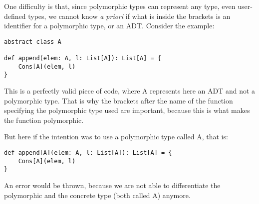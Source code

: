One difficulty is that, since polymorphic types can represent any type, even user-defined types, we cannot know \emph{a priori} if what is inside the brackets is an identifier for a polymorphic type, or an ADT. Consider the example:
\begin{lstlisting}
abstract class A

def append(elem: A, l: List[A]): List[A] = {
    Cons[A](elem, l)
}
\end{lstlisting}
This is a perfectly valid piece of code, where A represents here an ADT and not a polymorphic type. 
That is why the brackets after the name of the function specifying the polymorphic type used are important, because this is what makes the function polymorphic. 

But here if the intention was to use a polymorphic type called A, that is:
\begin{lstlisting}
def append[A](elem: A, l: List[A]): List[A] = {
    Cons[A](elem, l)
}
\end{lstlisting}
An error would be thrown, because we are not able to differentiate the polymorphic and the concrete type (both called A) anymore.

